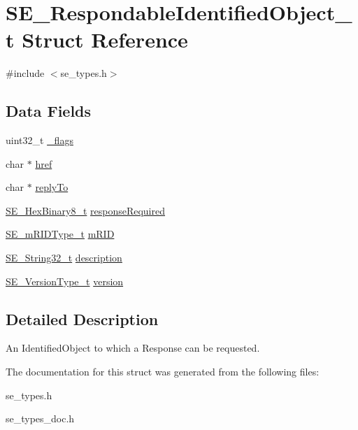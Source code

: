 \hypertarget{structSE__RespondableIdentifiedObject__t}{}\section{S\+E\+\_\+\+Respondable\+Identified\+Object\+\_\+t Struct Reference}
\label{structSE__RespondableIdentifiedObject__t}


{\ttfamily \#include $<$se\+\_\+types.\+h$>$}

\subsection*{Data Fields}
\begin{DoxyCompactItemize}
\item 
uint32\+\_\+t \hyperlink{group__RespondableIdentifiedObject_ga82b7a1e98f1e8257e1e251e1e12b21ad}{\+\_\+flags}
\item 
char $\ast$ \hyperlink{group__RespondableIdentifiedObject_gad04aef488a91cb6cc560b43b0f2f136b}{href}
\item 
char $\ast$ \hyperlink{group__RespondableIdentifiedObject_gacc38745c80ef60c65b39b81328769362}{reply\+To}
\item 
\hyperlink{group__HexBinary8_gaecf2dab3615fb954a693c017a61f77d6}{S\+E\+\_\+\+Hex\+Binary8\+\_\+t} \hyperlink{group__RespondableIdentifiedObject_gac5e7e3639c4de39371139e684101f745}{response\+Required}
\item 
\hyperlink{group__mRIDType_gac74622112f3a388a2851b2289963ba5e}{S\+E\+\_\+m\+R\+I\+D\+Type\+\_\+t} \hyperlink{group__RespondableIdentifiedObject_ga2daf457582bcbf32ba965d1ce49a5143}{m\+R\+ID}
\item 
\hyperlink{group__String32_gac9f59b06b168b4d2e0d45ed41699af42}{S\+E\+\_\+\+String32\+\_\+t} \hyperlink{group__RespondableIdentifiedObject_ga0a1440d88b9a579911a3576fb2070051}{description}
\item 
\hyperlink{group__VersionType_ga4b8d27838226948397ed99f67d46e2ae}{S\+E\+\_\+\+Version\+Type\+\_\+t} \hyperlink{group__RespondableIdentifiedObject_ga0cd2bf56b9f373bbdf164c8819041c18}{version}
\end{DoxyCompactItemize}


\subsection{Detailed Description}
An Identified\+Object to which a Response can be requested. 

The documentation for this struct was generated from the following files\+:\begin{DoxyCompactItemize}
\item 
se\+\_\+types.\+h\item 
se\+\_\+types\+\_\+doc.\+h\end{DoxyCompactItemize}
